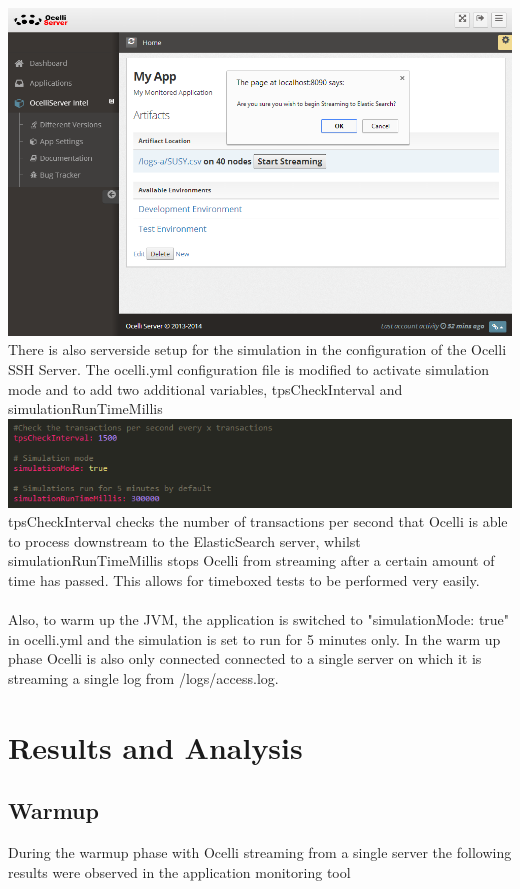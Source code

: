 \documentclass{llncs}
\begin{document}
\includegraphics[scale=0.5]{app2}\newline\newline
There is also serverside setup for the simulation in the configuration of the Ocelli SSH Server. The ocelli.yml configuration file is modified to activate simulation mode and to add two additional variables, tpsCheckInterval and simulationRunTimeMillis\newline\newline
\includegraphics[scale=0.75]{app3}\newline\newline
tpsCheckInterval checks the number of transactions per second that Ocelli is able to process downstream to the ElasticSearch server, whilst simulationRunTimeMillis stops Ocelli from streaming after a certain amount of time has passed. This allows for timeboxed tests to be performed very easily.
\\
\\
Also, to warm up the JVM, the application is switched to "simulationMode: true" in ocelli.yml and the simulation is set to run for 5 minutes only. In the warm up phase Ocelli is also only connected connected to a single server on which it is streaming a single log from /logs/access.log.
\pagebreak
\section{Results and Analysis}
\subsection{Warmup}
During the warmup phase with Ocelli streaming from a single server the following results were observed in the application monitoring tool
\end{document}
